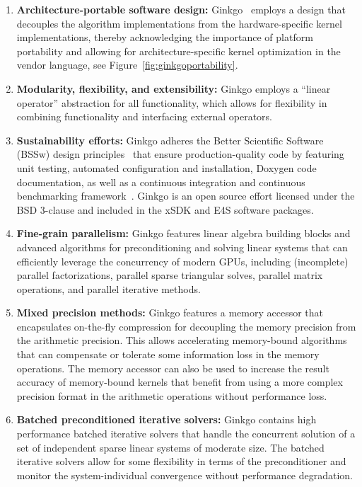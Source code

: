 \begin{enumerate}
  \item \textbf{Architecture-portable software design:}
		Ginkgo~\cite{anzt2020ginkgo} employs a design that decouples the
		algorithm implementations from the hardware-specific kernel
		implementations, thereby acknowledging the importance of platform
		portability and allowing for architecture-specific kernel optimization
		in the vendor language, see Figure~\ref{fig:ginkgoportability}.
  \item \textbf{Modularity, flexibility, and extensibility:} Ginkgo employs a
		``linear operator'' abstraction for all functionality, which allows for
		flexibility in combining functionality and interfacing external
		operators.
  \item \textbf{Sustainability efforts:} Ginkgo adheres the Better Scientific
		Software (BSSw) design principles~\cite{betterscientificsoftware} that
		ensure production-quality code by featuring unit testing, automated
		configuration and installation, Doxygen code documentation, as well as a
		continuous integration and continuous benchmarking
		framework~\cite{pasc_anzt}. Ginkgo is an open source effort licensed
		under the BSD 3-clause and included in the xSDK and E4S software
		packages.
  \item \textbf{Fine-grain parallelism:} Ginkgo features linear algebra
		building blocks and advanced algorithms for preconditioning and solving
		linear systems that can efficiently leverage the concurrency of modern
		GPUs, including (incomplete) parallel factorizations, parallel sparse
		triangular solves, parallel matrix operations, and parallel iterative
		methods.
  \item \textbf{Mixed precision methods:} Ginkgo features a memory accessor
		that encapsulates on-the-fly compression for decoupling the memory
		precision from the arithmetic precision. This allows accelerating
		memory-bound algorithms that can compensate or tolerate some information
		loss in the memory operations. The memory accessor can also be used to
		increase the result accuracy of memory-bound kernels that benefit from
		using a more complex precision format in the arithmetic operations
		without performance loss.
  \item \textbf{Batched preconditioned iterative solvers:} Ginkgo contains high
		performance batched iterative solvers that handle the concurrent
		solution of a set of independent sparse linear systems of moderate size.
		The batched iterative solvers allow for some flexibility in terms of the
		preconditioner and monitor the system-individual convergence without
		performance degradation.
\end{enumerate}

